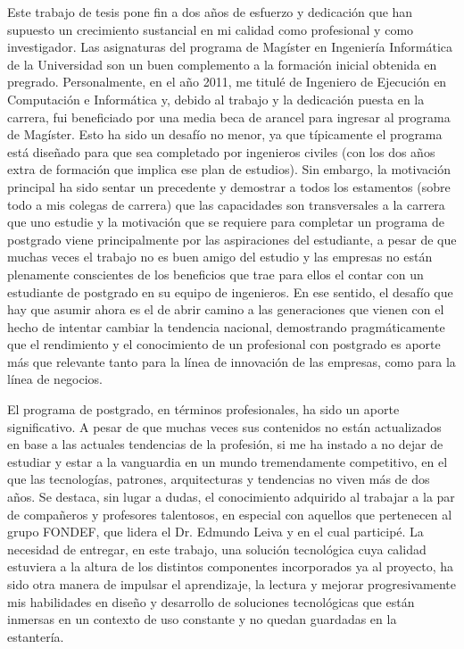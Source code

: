 Este trabajo de tesis pone fin a dos años de esfuerzo y dedicación que han supuesto un crecimiento sustancial en mi calidad como profesional y como investigador. Las asignaturas del programa de Magíster en Ingeniería Informática de la Universidad son un buen complemento a la formación inicial obtenida en pregrado. Personalmente, en el año 2011, me titulé de Ingeniero de Ejecución en Computación e Informática y, debido al trabajo y la dedicación puesta en la carrera, fui beneficiado por una media beca de arancel para ingresar al programa de Magíster. Esto ha sido un desafío no menor, ya que típicamente el programa está diseñado para que sea completado por ingenieros civiles (con los dos años extra de formación que implica ese plan de estudios). Sin embargo, la motivación principal ha sido sentar un precedente y demostrar a todos los estamentos (sobre todo a mis colegas de carrera) que las capacidades son transversales a la carrera que uno estudie y la motivación que se requiere para completar un programa de postgrado viene principalmente por las aspiraciones del estudiante, a pesar de que muchas veces el trabajo no es buen amigo del estudio y las empresas no están plenamente conscientes de los beneficios que trae para ellos el contar con un estudiante de postgrado en su equipo de ingenieros. En ese sentido, el desafío que hay que asumir ahora es el de abrir camino a las generaciones que vienen con el hecho de intentar cambiar la tendencia nacional, demostrando pragmáticamente que el rendimiento y el conocimiento de un profesional con postgrado es aporte más que relevante tanto para la línea de innovación de las empresas, como para la línea de negocios.

El programa de postgrado, en términos profesionales, ha sido un aporte significativo. A pesar de que muchas veces sus contenidos no están actualizados en base a las actuales tendencias de la profesión, si me ha instado a no dejar de estudiar y estar a la vanguardia en un mundo tremendamente competitivo, en el que las tecnologías, patrones, arquitecturas y tendencias no viven más de dos años. Se destaca, sin lugar a dudas, el conocimiento adquirido al trabajar a la par de compañeros y profesores talentosos, en especial con aquellos que pertenecen al grupo FONDEF, que lidera el Dr. Edmundo Leiva y en el cual participé. La necesidad de entregar, en este trabajo, una solución tecnológica cuya calidad estuviera a la altura de los distintos componentes incorporados ya al proyecto, ha sido otra manera de impulsar el aprendizaje, la lectura y mejorar progresivamente mis habilidades en diseño y desarrollo de soluciones tecnológicas que están inmersas en un contexto de uso constante y no quedan guardadas en la estantería.

